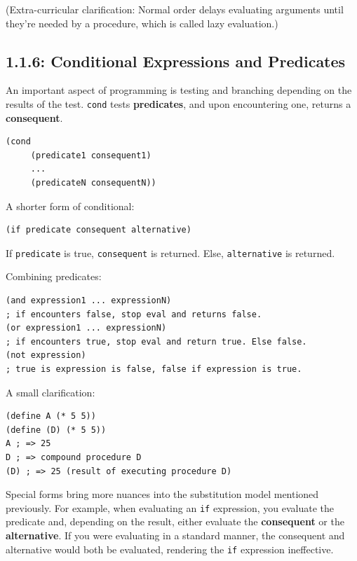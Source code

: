 \documentclass[final,fleqn,titlepage,twoside]{article}
\begin{document}
(Extra-curricular clarification: Normal order delays evaluating arguments until
they're needed by a procedure, which is called lazy evaluation.)

\subsection{1.1.6: Conditional Expressions and Predicates}
\label{sec:org0d5229d}
An important aspect of programming is testing and branching depending on the
results of the test. \texttt{cond} tests \textbf{predicates}, and upon encountering one,
returns a \textbf{consequent}.

\begin{verbatim}
(cond
     (predicate1 consequent1)
     ...
     (predicateN consequentN))
\end{verbatim}

A shorter form of conditional:

\begin{verbatim}
(if predicate consequent alternative)
\end{verbatim}

If \texttt{predicate} is true, \texttt{consequent} is returned. Else,
\texttt{alternative} is returned.

Combining predicates:

\begin{verbatim}
(and expression1 ... expressionN)
; if encounters false, stop eval and returns false.
(or expression1 ... expressionN)
; if encounters true, stop eval and return true. Else false.
(not expression)
; true is expression is false, false if expression is true.
\end{verbatim}

A small clarification:

\begin{verbatim}
(define A (* 5 5))
(define (D) (* 5 5))
A ; => 25
D ; => compound procedure D
(D) ; => 25 (result of executing procedure D)
\end{verbatim}

Special forms bring more nuances into the substitution model mentioned
previously. For example, when evaluating an \texttt{if} expression, you
evaluate the predicate and, depending on the result, either evaluate the
\textbf{consequent} or the \textbf{alternative}. If you were evaluating in a standard manner,
the consequent and alternative would both be evaluated, rendering the
\texttt{if} expression ineffective.
\end{document}
